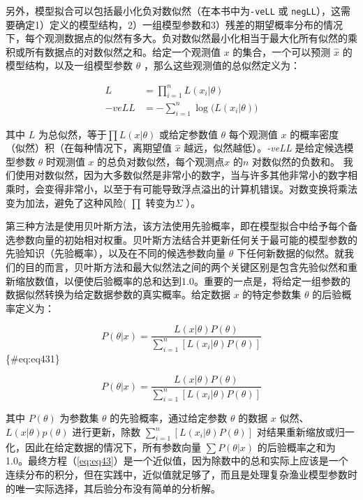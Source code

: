 \documentclass[
  lang=cn,
  11pt,
  scheme=chinese,
  chinesefont=nofont,
  citestyle=gb7714-2015,
  bibstyle=gb7714-2015]{elegantbook}
\begin{document}
另外，模型拟合可以包括最小化负对数似然（在本书中为\texttt{-veLL} 或 \texttt{negLL}），这需要确定1）定义的模型结构，2）一组模型参数和3）残差的期望概率分布的情况下，每个观测数据点的似然有多大。负对数似然最小化相当于最大化所有似然的乘积或所有数据点的对数似然之和。给定一个观测值 \(x\) 的集合，一个可以预测 \(\hat x\) 的模型结构，以及一组模型参数 \(\theta\) ，那么这些观测值的总似然定义为：

\begin{equation}  
\begin{split}  
{L} &= \prod\limits_{i=1}^{n}{{L}\left( {x_i|\theta}\right )}  \\  
{-veLL} &= -\sum\limits_{i=1}^{n}{ \log{({L}\left( {x_i|\theta}\right )})}  
\end{split}  
\label{eq:eq42}
\end{equation}

其中 \(L\) 为总似然，等于\(\prod L(x|\theta)\) 或给定参数值 \(\theta\) 每个观测值 \(x\) 的概率密度（似然）积（在每种情况下，离期望值 \(\hat x\) 越远，似然越低）。\emph{-veLL} 是给定候选模型参数 \(\theta\) 时观测值 \(x\) 的总负对数似然，每个观测点\(x\) 的\(n\) 对数似然的负数和。 我们使用对数似然，因为大多数似然是非常小的数字，当与许多其他非常小的数字相乘时，会变得非常小，以至于有可能导致浮点溢出的计算机错误。对数变换将乘法变为加法，避免了这种风险( \(\prod\) 转变为\(\Sigma\) ）。

第三种方法是使用贝叶斯方法，该方法使用先验概率，即在模型拟合中给予每个备选参数向量的初始相对权重。贝叶斯方法结合并更新任何关于最可能的模型参数的先验知识（先验概率），以及在不同的候选参数向量 \(\theta\) 下任何新数据的似然。就我们的目的而言，贝叶斯方法和最大似然法之间的两个关键区别是包含先验似然和重新缩放数值，以便使后验概率的总和达到1.0。重要的一点是，将给定一组参数的数据似然转换为给定数据参数的真实概率。给定数据 \(x\) 的特定参数集 \(\theta\) 的后验概率定义为：

\[
\begin{equation}
P(\theta|x)=\frac{L(x|\theta)P(\theta)}{\sum\limits_{i=1}^{n}{\left[ L(x_i|\theta)P(\theta)\right]}}
\end{equation}
\]\{\#eq:eq431\}

\begin{equation}  
P(\theta|x)=\frac{L(x|\theta)P(\theta)}{\sum\limits_{i=1}^{n}{\left[ L(x_i|\theta)P(\theta)\right]}}  
\label{eq:eq43}  
\end{equation}

其中 \(P(\theta)\) 为参数集 \(\theta\) 的先验概率，通过给定参数 \(\theta\) 的数据 \(x\) 似然、\(L(x|\theta)p(\theta)\) 进行更新，除数 \(\sum_{i=1}^n[L(x_i|\theta)P(\theta)]\) 对结果重新缩放或归一化，因此在给定数据的情况下，所有参数向量 \(\sum P(\theta|x)\) 的后验概率之和为1.0。最终方程（\eqref{eq:eq43}）是一个近似值，因为除数中的总和实际上应该是一个连续分布的积分，但在实践中，近似值就足够了，而且是处理复杂渔业模型参数时的唯一实际选择，其后验分布没有简单的分析解。
\end{document}
